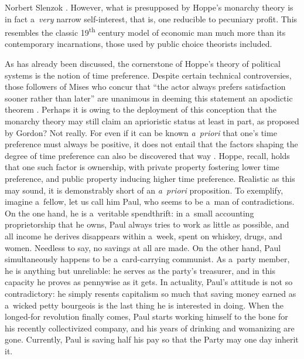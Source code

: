 \begin{artengenv}{Norbert Slenzok}
{%
\parencite[][]{boettke_austrian_2002}. %
 However, what is presupposed by Hoppe's monarchy theory is in fact a~\textit{very} narrow self-interest, that is, one reducible to pecuniary profit. This resembles the classic 19\textsuperscript{th} century model of economic man much more than its contemporary incarnations, those used by public choice theorists included. }



As has already been discussed, the cornerstone of Hoppe's theory of political systems is the notion of time preference. Despite certain technical controversies, those followers of Mises who concur that ``the actor always prefers satisfaction sooner rather than later'' are unanimous in deeming this statement an apodictic theorem 
\parencites[][]{herbener_introduction_2011}[][pp.480–485]{mises_human_1998}[][p.15]{rothbard_man_2009}. %
 Perhaps it is owing to the deployment of this conception that the monarchy theory may still claim an aprioristic status at least in part, as proposed by Gordon? Not really. For even if it can be known \textit{a~priori} that one's time preference must always be positive, it does not entail that the factors shaping the degree of time preference can also be discovered that way 
\parencite[][]{block_relationship_2006}. %
 Hoppe, recall, holds that one such factor is ownership, with private property fostering lower time preference, and public property inducing higher time preference. Realistic as this may sound, it is demonstrably short of an \textit{a~priori} proposition. To exemplify, imagine a~fellow, let us call him Paul, who seems to be a~man of contradictions. On the one hand, he is a~veritable spendthrift: in a~small accounting proprietorship that he owns, Paul always tries to work as little as possible, and all income he derives disappears within a~week, spent on whiskey, drugs, and women. Needless to say, no savings at all are made. On the other hand, Paul simultaneously happens to be a~card-carrying communist. As a~party member, he is anything but unreliable: he serves as the party's treasurer, and in this capacity he proves as pennywise as it gets. In actuality, Paul's attitude is not so contradictory: he simply resents capitalism so much that saving money earned as a~wicked petty bourgeois is the last thing he is interested in doing. When the longed-for revolution finally comes, Paul starts working himself to the bone for his recently collectivized company, and his years of drinking and womanizing are gone. Currently, Paul is saving half his pay so that the Party may one day inherit it.




\end{artengenv}
